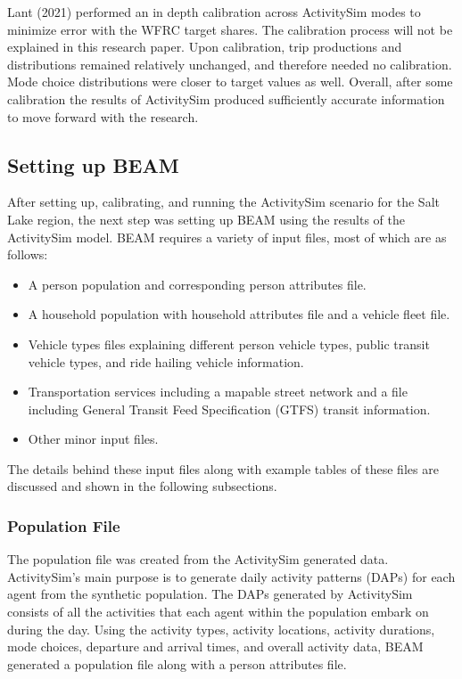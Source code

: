\documentclass[12pt, oneside, openright]{byuthesis}
\providecommand{\tightlist}{%
  \setlength{\itemsep}{0pt}\setlength{\parskip}{0pt}}
\begin{document}
Lant (2021) performed an in depth calibration across ActivitySim modes to minimize error with the WFRC target shares. The calibration process will not be explained in this research paper. Upon calibration, trip productions and distributions remained relatively unchanged, and therefore needed no calibration. Mode choice distributions were closer to target values as well. Overall, after some calibration the results of ActivitySim produced sufficiently accurate information to move forward with the research.

\hypertarget{setting-up-beam}{%
\subsection{Setting up BEAM}\label{setting-up-beam}}

After setting up, calibrating, and running the ActivitySim scenario for the Salt Lake region, the next step was setting up BEAM using the results of the ActivitySim model. BEAM requires a variety of input files, most of which are as follows:

\begin{itemize}
\tightlist
\item
  A person population and corresponding person attributes file.
\item
  A household population with household attributes file and a vehicle fleet file.
\item
  Vehicle types files explaining different person vehicle types, public transit vehicle types, and ride hailing vehicle information.
\item
  Transportation services including a mapable street network and a file including General Transit Feed Specification (GTFS) transit information.
\item
  Other minor input files.
\end{itemize}

The details behind these input files along with example tables of these files are discussed and shown in the following subsections.

\hypertarget{population-file}{%
\subsubsection{Population File}\label{population-file}}

The population file was created from the ActivitySim generated data. ActivitySim's main purpose is to generate daily activity patterns (DAPs) for each agent from the synthetic population. The DAPs generated by ActivitySim consists of all the activities that each agent within the population embark on during the day. Using the activity types, activity locations, activity durations, mode choices, departure and arrival times, and overall activity data, BEAM generated a population file along with a person attributes file.
\end{document}
